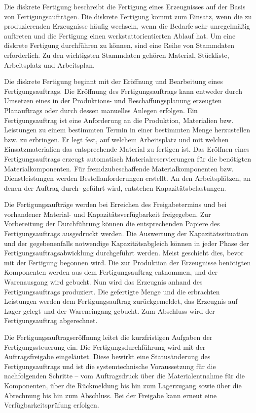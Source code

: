 Die diskrete Fertigung  beschreibt die Fertigung eines Erzeugnisses auf der Basis von Fertigungsaufträgen. Die diskrete Fertigung kommt zum Einsatz, wenn die zu produzierenden Erzeugnisse häufig wechseln, wenn die Bedarfe sehr unregelmäßig auftreten und die Fertigung einen werkstattorientierten Ablauf hat. Um eine diskrete Fertigung durchführen zu können, sind eine Reihe von Stammdaten erforderlich. Zu den wichtigsten Stammdaten gehören Material, Stückliste, Arbeitsplatz und Arbeitsplan.

Die diskrete Fertigung beginnt mit der Eröffnung und Bearbeitung eines Fertigungsauftrags. Die Eröffnung des Fertigungsauftrags kann entweder durch Umsetzen eines in der Produktions- und Beschaffungsplanung erzeugten Planauftrags oder durch dessen manuelles Anlegen erfolgen. Ein Fertigungsauftrag ist eine Anforderung an die Produktion, Materialien bzw. Leistungen zu einem bestimmten Termin in einer bestimmten Menge herzustellen bzw. zu erbringen. Er legt fest, auf welchem Arbeitsplatz und mit welchen Einsatzmaterialien das entsprechende Material zu fertigen ist. Das Eröffnen eines Fertigungsauftrags erzeugt automatisch Materialreservierungen für die benötigten Materialkomponenten. Für fremdzubeschaffende Materialkomponenten bzw. Dienstleistungen werden Bestellanforderungen erstellt. An den Arbeitsplätzen, an denen der Auftrag durch- geführt wird, entstehen Kapazitätsbelastungen.

Die Fertigungsaufträge werden bei Erreichen des Freigabetermins und bei vorhandener Material- und Kapazitätsverfügbarkeit freigegeben. Zur Vorbereitung der Durchführung können die entsprechenden Papiere des Fertigungsauftrags ausgedruckt werden. Die Auswertung der Kapazitätssituation und der gegebenenfalls notwendige Kapazitätsabgleich können in jeder Phase der Fertigungsauftragsabwicklung durchgeführt werden. Meist geschieht dies, bevor mit der Fertigung begonnen wird. Die zur Produktion der Erzeugnisse benötigten Komponenten werden aus dem Fertigungsauftrag entnommen, und der Warenausgang wird gebucht. Nun wird das Erzeugnis anhand des Fertigungsauftrags produziert. Die gefertigte Menge und die erbrachten Leistungen werden dem Fertigungsauftrag zurückgemeldet, das Erzeugnis auf Lager gelegt und der Wareneingang gebucht. Zum Abschluss wird der Fertigungsauftrag abgerechnet.

Die Fertigungsauftragseröffnung leitet die kurzfristigen Aufgaben der Fertigungssteuerung ein. 
Die Fertigungsdurchführung wird mit der Auftragsfreigabe eingeläutet. Diese bewirkt eine Statusänderung des Fertigungsauftrags und ist die systemtechnische Voraussetzung für die nachfolgenden Schritte – vom Auftragsdruck über die Materialentnahme für die Komponenten, über die Rückmeldung bis hin zum Lagerzugang sowie über die Abrechnung bis hin zum Abschluss. Bei der Freigabe kann erneut eine Verfügbarkeitsprüfung erfolgen.

